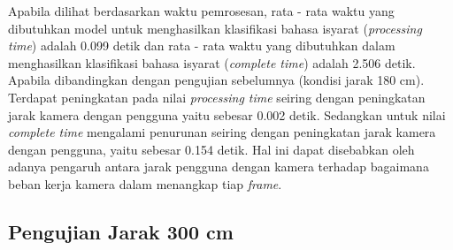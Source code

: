 Apabila dilihat berdasarkan waktu pemrosesan, rata - rata waktu yang dibutuhkan model untuk menghasilkan klasifikasi bahasa isyarat (\emph{processing time}) adalah 0.099 detik dan rata - rata waktu yang dibutuhkan dalam menghasilkan klasifikasi bahasa isyarat (\emph{complete time}) adalah 2.506 detik. Apabila dibandingkan dengan pengujian sebelumnya (kondisi jarak 180 cm). Terdapat peningkatan pada nilai \emph{processing time} seiring dengan peningkatan jarak kamera dengan pengguna yaitu sebesar 0.002 detik. Sedangkan untuk nilai \emph{complete time} mengalami penurunan seiring dengan peningkatan jarak kamera dengan pengguna, yaitu sebesar 0.154 detik. Hal ini dapat disebabkan oleh adanya pengaruh antara jarak pengguna dengan kamera terhadap bagaimana beban kerja kamera dalam menangkap tiap \emph{frame}.

\subsection{Pengujian Jarak 300 cm}
\label{sec:analisisjarak3}

